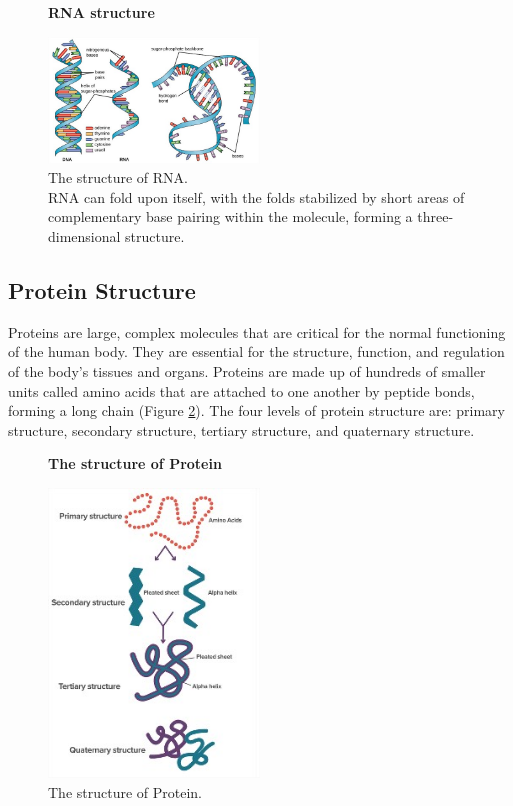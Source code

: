 \begin{figure}[h!]
	  \centering
	  	\caption{\textbf{RNA structure}}
	  \label{fig:rna_strcture}

    \includegraphics[width=0.5\textwidth]{background figures/rnastructure.jpg}
    	\caption*{The structure of RNA.\\  RNA can fold upon itself, with the folds stabilized by short areas of complementary base pairing within the molecule, forming a three-dimensional structure.\cite{figRNAStructure}
    	}
\end{figure}

\subsection{Protein Structure}
Proteins are large, complex molecules that are critical for the normal functioning of the human body. They are essential for the structure, function, and regulation of the body's tissues and organs. Proteins are made up of hundreds of smaller units called amino acids that are attached to one another by peptide bonds, forming a long chain (Figure \ref{fig:protein_structure}).
The four levels of protein structure are: primary structure, secondary structure, tertiary structure, and quaternary structure. 

\begin{figure}[h!]
	  \centering
	  \caption{\textbf{The structure of Protein}}
	  	  \label{fig:protein_structure}


    \includegraphics[width=0.5\textwidth]{background figures/proteinstructure.jpg}
    	\caption*{The structure of Protein.\cite{figProteinStructure}
    	}
\end{figure}

